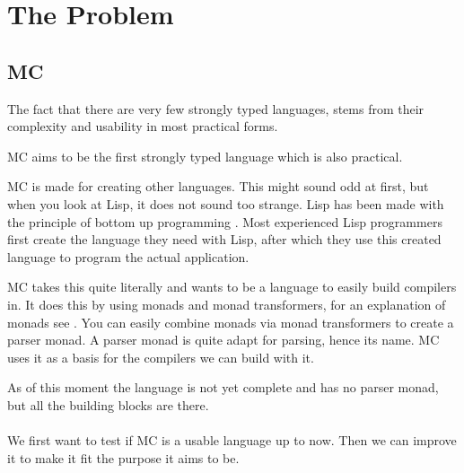 \section{The Problem}

\subsection{MC}
The fact that there are very few strongly typed languages, stems from their complexity and usability in most practical forms.

MC aims to be the first strongly typed language which is also practical.

MC is made for creating other languages.
This might sound odd at first, but when you look at Lisp, it does not sound too strange.
Lisp has been made with the principle of bottom up programming \cite{graham1994lisp}.
Most experienced Lisp programmers first create the language they need with Lisp, after which they use this created language to program the actual application.

MC takes this quite literally and wants to be a language to easily build compilers in.
It does this by using monads and monad transformers, for an explanation of monads see \cite{wadler1992comprehending}.
You can easily combine monads via monad transformers to create a parser monad.
A parser monad is quite adapt for parsing, hence its name.
MC uses it as a basis for the compilers we can build with it.

As of this moment the language is not yet complete and has no parser monad, but all the building blocks are there.

\paragraph{}
We first want to test if MC is a usable language up to now. Then we can improve it to make it fit the purpose it aims to be.
